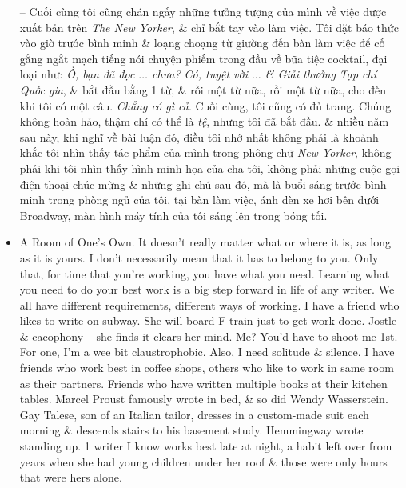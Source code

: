\documentclass{article}
\begin{document}
\begin{itemize}
	-- Cuối cùng tôi cũng chán ngấy những tưởng tượng của mình về việc được xuất bản trên {\it The New Yorker}, \& chỉ bắt tay vào làm việc. Tôi đặt báo thức vào giờ trước bình minh \& loạng choạng từ giường đến bàn làm việc để cố gắng ngắt mạch tiếng nói chuyện phiếm trong đầu về bữa tiệc cocktail, đại loại như: {\it Ồ, bạn đã đọc $\ldots$ chưa? Có, tuyệt vời $\ldots$ \& Giải thưởng Tạp chí Quốc gia}, \& bắt đầu bằng 1 từ, \& rồi một từ nữa, rồi một từ nữa, cho đến khi tôi có một câu. {\it Chẳng có gì cả}. Cuối cùng, tôi cũng có đủ trang. Chúng không hoàn hảo, thậm chí có thể là {\it tệ}, nhưng tôi đã bắt đầu. \& nhiều năm sau này, khi nghĩ về bài luận đó, điều tôi nhớ nhất không phải là khoảnh khắc tôi nhìn thấy tác phẩm của mình trong phông chữ {\it New Yorker}, không phải khi tôi nhìn thấy hình minh họa của cha tôi, không phải những cuộc gọi điện thoại chúc mừng \& những ghi chú sau đó, mà là buổi sáng trước bình minh trong phòng ngủ của tôi, tại bàn làm việc, ánh đèn xe hơi bên dưới Broadway, màn hình máy tính của tôi sáng lên trong bóng tối.
	\item {\sf A Room of One's Own.} It doesn't really matter what or where it is, as long as it is yours. I don't necessarily mean that it has to belong to you. Only that, for time that you're working, you have what you need. Learning what you need to do your best work is a big step forward in life of any writer. We all have different requirements, different ways of working. I have a friend who likes to write on subway. She will board F train just to get work done. Jostle \& cacophony -- she finds it clears her mind. Me? You'd have to shoot me 1st. For one, I'm a wee bit claustrophobic. Also, I need solitude \& silence. I have friends who work best in coffee shops, others who like to work in same room as their partners. Friends who have written multiple books at their kitchen tables. {\sc Marcel Proust} famously wrote in bed, \& so did {\sc Wendy Wasserstein}. {\sc Gay Talese}, son of an Italian tailor, dresses in a custom-made suit each morning \& descends stairs to his basement study. {\sc Hemmingway} wrote standing up. 1 writer I know works best late at night, a habit left over from years when she had young children under her roof \& those were only hours that were hers alone.
	

\end{itemize}
\end{document}
